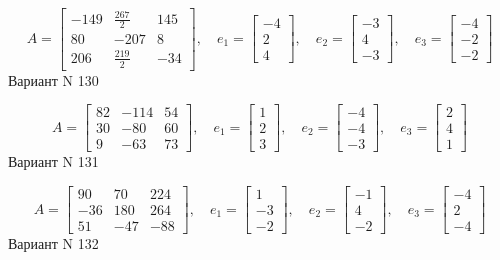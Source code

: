 \documentclass[11pt]{report}
\begin{document}
$$A = \left[\begin{matrix}-149 & \frac{267}{2} & 145\\80 & -207 & 8\\206 & \frac{219}{2} & -34\end{matrix}\right],\quad e_1 = \left[\begin{matrix}-4\\2\\4\end{matrix}\right],\quad e_2 = \left[\begin{matrix}-3\\4\\-3\end{matrix}\right],\quad e_3 = \left[\begin{matrix}-4\\-2\\-2\end{matrix}\right]$$Вариант N 130

$$A = \left[\begin{matrix}82 & -114 & 54\\30 & -80 & 60\\9 & -63 & 73\end{matrix}\right],\quad e_1 = \left[\begin{matrix}1\\2\\3\end{matrix}\right],\quad e_2 = \left[\begin{matrix}-4\\-4\\-3\end{matrix}\right],\quad e_3 = \left[\begin{matrix}2\\4\\1\end{matrix}\right]$$Вариант N 131

$$A = \left[\begin{matrix}90 & 70 & 224\\-36 & 180 & 264\\51 & -47 & -88\end{matrix}\right],\quad e_1 = \left[\begin{matrix}1\\-3\\-2\end{matrix}\right],\quad e_2 = \left[\begin{matrix}-1\\4\\-2\end{matrix}\right],\quad e_3 = \left[\begin{matrix}-4\\2\\-4\end{matrix}\right]$$Вариант N 132
\end{document}

